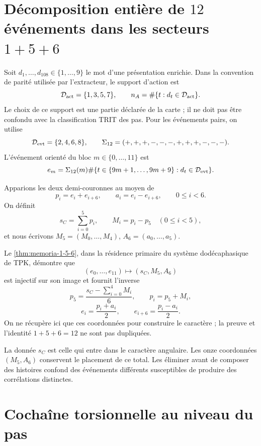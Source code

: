 \section{Décomposition entière de \(12\) événements dans les secteurs \(1+5+6\)}

Soit \(d_1,\ldots,d_{108}\in\{1,\ldots,9\}\) le mot d'une présentation
enrichie. Dans la convention de parité utilisée par l'extracteur, le support
d'action est
\[
 \mathcal D_{\rm act}=\{1,3,5,7\},
 \qquad
 n_A=\#\{t:d_t\in\mathcal D_{\rm act}\}.
\]
Le choix de ce support est une partie déclarée de la carte ; il ne doit pas
être confondu avec la classification TRIT des pas. Pour les événements pairs, on
utilise
\[
 \mathcal D_{\rm evt}=\{2,4,6,8\},
 \qquad
 \Sigma_{12}=(+,+,+,-,-,-,+,+,+,-,-,-).
\]
L'événement orienté du bloc \(m\in\{0,\ldots,11\}\) est
\[
 e_m=\Sigma_{12}(m)
 \#\{t\in\{9m+1,\ldots,9m+9\}:d_t\in\mathcal D_{\rm evt}\}.
\]

Apparions les deux demi-couronnes au moyen de
\[
 p_i=e_i+e_{i+6},
 \qquad
 a_i=e_i-e_{i+6},
 \qquad 0\leq i<6.
\]
On définit
\[
 s_C=\sum_{i=0}^{5}p_i,
 \qquad
 M_i=p_i-p_5\quad(0\leq i<5),
\]
et nous écrivons \(M_5=(M_0,\ldots,M_4)\),
\(A_6=(a_0,\ldots,a_5)\).

Le \cref{thm:memoria-1-5-6}, dans la résidence primaire du système
dodécaphasique de TPK, démontre que
\[
 (e_0,\ldots,e_{11})\longmapsto(s_C,M_5,A_6)
\]
est injectif sur son image et fournit l'inverse
\[
 p_5=\frac{s_C-\sum_{i=0}^{4}M_i}{6},\qquad
 p_i=p_5+M_i,
\]
\[
 e_i=\frac{p_i+a_i}{2},\qquad
 e_{i+6}=\frac{p_i-a_i}{2}.
\]
On ne récupère ici que ces coordonnées pour construire le caractère ; la
preuve et l'identité \(1+5+6=12\) ne sont pas dupliquées.

La donnée \(s_C\) est celle qui entre dans le caractère angulaire. Les onze coordonnées
\((M_5,A_6)\) conservent le placement de ce total. Les éliminer avant de
composer des histoires confond des événements différents susceptibles de produire
des corrélations distinctes.

\section{Cochaîne torsionnelle au niveau du pas}

